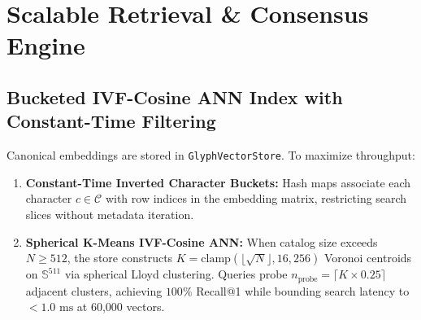 \documentclass[10pt,twocolumn,letterpaper]{article}
\begin{document}
\section{Scalable Retrieval \& Consensus Engine}

\subsection{Bucketed IVF-Cosine ANN Index with Constant-Time Filtering}
Canonical embeddings are stored in \texttt{GlyphVectorStore}. To maximize throughput:
\begin{enumerate}
    \item \textbf{Constant-Time Inverted Character Buckets:} Hash maps associate each character $c \in \mathcal{C}$ with row indices in the embedding matrix, restricting search slices without metadata iteration.
    \item \textbf{Spherical K-Means IVF-Cosine ANN:} When catalog size exceeds $N \ge 512$, the store constructs $K = \text{clamp}(\lfloor\sqrt{N}\rfloor, 16, 256)$ Voronoi centroids on $\mathbb{S}^{511}$ via spherical Lloyd clustering. Queries probe $n_{\text{probe}} = \lceil K \times 0.25 \rceil$ adjacent clusters, achieving $100\%$ Recall@1 while bounding search latency to $< 1.0\text{ ms}$ at 60,000 vectors.
\end{enumerate}
\end{document}
